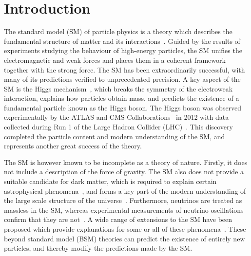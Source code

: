 \chapter{Introduction}
\label{chap:intro}

The standard model (SM) of particle physics is a theory which describes
the fundamental structure of matter and its interactions~\cite{Glashow,Weinberg,Salam}.
Guided by the results of experiments studying the behaviour of high-energy particles, 
the SM unifies the electromagnetic and weak forces and places them in a coherent framework
together with the strong force.
The SM has been extraordinarily successful, 
with many of its predictions verified to unprecedented precision.
A key aspect of the SM is the Higgs mechanism~\cite{HiggsPaper,BroutEnglert,KibbleEtc}, 
which breaks the symmetry of the electroweak interaction, explains how particles obtain mass, 
and predicts the existence of a fundamental particle known as the Higgs boson.
The Higgs boson was observed experimentally by the ATLAS and CMS Collaborations~\cite{ATLAS,ATLASdiscovery,CMSdetector,CMSdiscovery}
in 2012 with data collected during Run 1 of the Large Hadron Collider (LHC)~\cite{LHCpaper}.
This discovery completed the particle content and modern understanding of the SM, 
and represents another great success of the theory.

The SM is however known to be incomplete as a theory of nature.
Firstly, it does not include a description of the force of gravity.
The SM also does not provide a suitable candidate for dark matter, 
which is required to explain certain astrophysical phenomena~\cite{BulletCluster},
and forms a key part of the modern understanding 
of the large scale structure of the universe~\cite{Planck}.
Furthermore, neutrinos are treated as massless in the SM, 
whereas experimental measurements of neutrino oscillations confirm that they are not~\cite{NeutrinoOscillation}.
A wide range of extensions to the SM have been proposed 
which provide explanations for some or all of these phenomena~\cite{SUSY}.
These beyond standard model (BSM) theories can predict the existence of entirely new particles, 
and thereby modify the predictions made by the SM.


